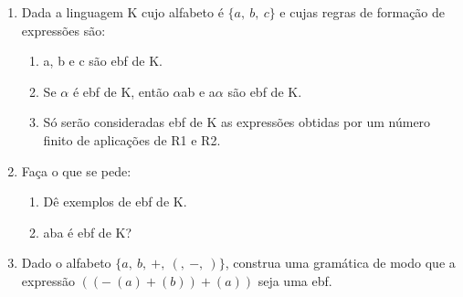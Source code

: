 \begin{enumerate}[label=\arabic*)]
\begin{enumerate}[label=\alph*)]
        \item Dada a linguagem K cujo alfabeto é $\{a,\ b,\ c\}$ e cujas regras de formação de expressões são:
        \begin{enumerate}[label=R{\arabic*}.]
            \item a, b e c são ebf de K.
            \item Se $\alpha$ é ebf de K, então $\alpha$ab e a$\alpha$ são ebf de K.
            \item Só serão consideradas ebf de K as expressões obtidas por um número finito de aplicações de R1 e R2.
        \end{enumerate}

        \item[] Faça o que se pede:
        \begin{enumerate}[label=\roman*)]
            \item Dê exemplos de ebf de K.
            \item aba é ebf de K?
        \end{enumerate}

        \item Dado o alfabeto $\{ a,\ b,\ +,\ (,\ -,\ )\}$, construa uma gramática de modo que a expressão $((-\ (a) + (b)) + (a))$ seja uma ebf.

    \end{enumerate}
\end{enumerate}
